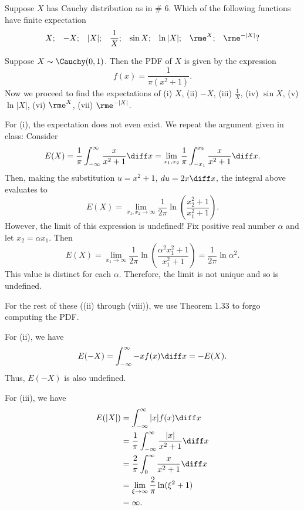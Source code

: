 \begin{problem}[Handout 13, \# 10]
  Suppose \(X\) has Cauchy distribution as in \# 6. Which of the following
  functions have finite expectation
  \[
    \begin{aligned}
      X;&&-X;&&|X|;&&\frac{1}{X};&&\sin X;&&\ln|X|;&&\rme^X;&&\rme^{-|X|}?
    \end{aligned}
  \]
\end{problem}
\begin{solution}
  Suppose \(X\sim\Cauchy(0,1)\). Then the PDF of \(X\) is given by the
  expression
  \[
    f(x)=\frac{1}{\pi(x^2+1)}.
  \]
  Now we proceed to find the expectations of (i) \(X\), (ii) \(-X\),
  (iii) \(\frac{1}{X}\), (iv) \(\sin X\), (v) \(\ln|X|\), (vi) \(\rme^X\),
  (vii) \(\rme^{{-}|X|}\).

  For (i), the expectation does not even exist. We repeat the argument
  given in class: Consider
  \[
    E(X)
    =\frac{1}{\pi}\int_{-\infty}^\infty \frac{x}{x^2+1}\diff x
    =\lim_{x_1,x_2}\frac{1}{\pi}\int_{-x_1}^{x_2}\frac{x}{x^2+1}\diff x.
  \]
  Then, making the substitution \(u=x^2+1\), \(du=2x\diff x\), the integral
  above evaluates to
  \[
    E(X)=\lim_{x_1,x_2\to\infty}\frac{1}{2\pi}\ln\left(\frac{x_2^2+1}{x_1^2+1}\right).
  \]
  However, the limit of this expression is undefined! Fix positive real
  number \(\alpha\) and let \(x_2=\alpha x_1\). Then
  \[
    E(X)=%
    \lim_{x_1\to\infty}\frac{1}{2\pi}\ln\left(\frac{\alpha^2x_1^2+1}{x_1^2+1}\right)=%
    \frac{1}{2\pi}\ln\alpha^2.
  \]
  This value is distinct for each \(\alpha\). Therefore, the limit is not
  unique and so is undefined.

  For the rest of these ((ii) through (viii)), we use Theorem 1.33 to forgo
  computing the PDF.

  For (ii), we have
  \[
    E(-X)=\int_{-\infty}^\infty -xf(x)\diff x=-E(X).
  \]
  Thus, \(E(-X)\) is also undefined.

  For (iii), we have
  \begin{align*}
    E(|X|)
    &=\int_{-\infty}^\infty |x| f(x)\diff x\\
    &=\frac{1}{\pi}\int_{-\infty}^\infty\frac{|x|}{x^2+1}\diff x\\
    &=\frac{2}{\pi}\int_0^\infty\frac{x}{x^2+1}\diff x\\
    &=\lim_{\xi\to\infty}\frac{2}{\pi}\ln(\xi^2+1)\\
    &=\infty.
  \end{align*}


\end{solution}
